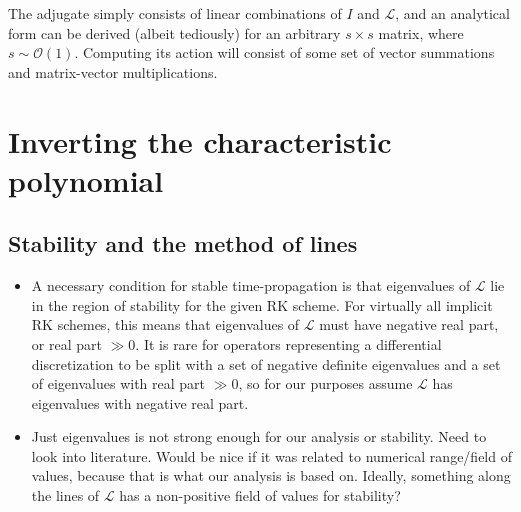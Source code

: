 \documentclass[a4paper,10pt]{article}
\begin{document}
The adjugate simply consists of linear combinations of $I$ and $\mathcal{L}$, and an analytical
form can be derived (albeit tediously) for an arbitrary $s\times s$ matrix, where
$s\sim\mathcal{O}(1)$. Computing its action will consist of some set of vector summations
and matrix-vector multiplications.



\section{Inverting the characteristic polynomial}

\subsection{Stability and the method of lines}

{\color{blue}
\begin{itemize}

\item A necessary condition for stable time-propagation is that eigenvalues of $\mathcal{L}$
lie in the region of stability for the given RK scheme. For virtually all implicit RK schemes,
this means that eigenvalues of $\mathcal{L}$ must have negative real part, or real part
$\gg 0$. It is rare for operators representing a differential discretization to be split
with a set of negative definite eigenvalues and a set of eigenvalues with real part $\gg 0$,
so for our purposes assume $\mathcal{L}$ has eigenvalues with negative real part.

\item Just eigenvalues is not strong enough for our analysis or stability. Need to look
into literature. Would be nice if it was related to numerical range/field of values, because
that is what our analysis is based on. Ideally, something along the lines of $\mathcal{L}$ 
has a non-positive field of values for stability? 
\end{itemize}
}
\end{document}
